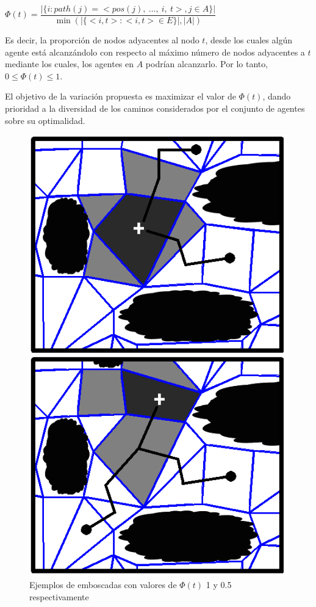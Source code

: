\documentclass{egpubl}
\begin{document}
$\Phi(t) = \dfrac{|\{ i : path(j) = <pos(j),\ \ldots,\ i,\ t>, j \in A\}|}
	  {\min(|\{ <i,t> : <i,t> \in E \} |,|A|) }$

Es decir, la proporción de nodos adyacentes al nodo $t$,
desde los cuales algún agente está alcanzándolo con
respecto al máximo número de nodos adyacentes a $t$ mediante
los cuales, los agentes en $A$ podrían alcanzarlo. Por lo tanto,
$0 \leq \Phi(t) \leq 1$.

El objetivo de la variación propuesta es maximizar el valor
de $\Phi(t)$, dando prioridad a la diversidad de los caminos
considerados por el conjunto de agentes sobre su optimalidad.

\begin{figure}[htb]
	\begin{center}
		\includegraphics[scale=0.4]{ambush_rate.png}
	\end{center}
	\caption{\label{fig:phi}
	     Ejemplos de emboscadas con valores de $\Phi(t)$ 
	     1 y 0.5 respectivamente}
\end{figure}
\end{document}
